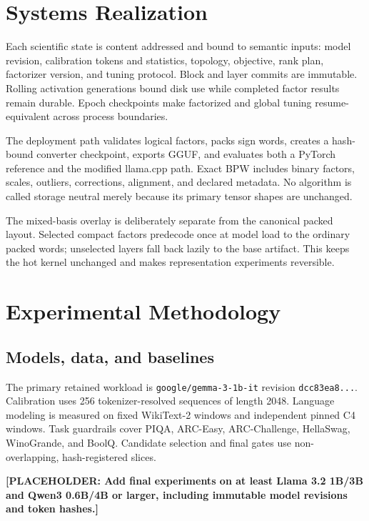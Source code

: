 \documentclass[10pt]{article}
\newcommand{\placeholder}[1]{\textcolor{red!70!black}{\textbf{[PLACEHOLDER: #1]}}}
\begin{document}
\section{Systems Realization}

Each scientific state is content addressed and bound to semantic inputs:
model revision, calibration tokens and statistics, topology, objective,
rank plan, factorizer version, and tuning protocol. Block and layer commits
are immutable. Rolling activation generations bound disk use while completed
factor results remain durable. Epoch checkpoints make factorized and global
tuning resume-equivalent across process boundaries.

The deployment path validates logical factors, packs sign words, creates a
hash-bound converter checkpoint, exports GGUF, and evaluates both a PyTorch
reference and the modified llama.cpp path. Exact BPW includes binary factors,
scales, outliers, corrections, alignment, and declared metadata. No algorithm
is called storage neutral merely because its primary tensor shapes are
unchanged.

The mixed-basis overlay is deliberately separate from the canonical packed
layout. Selected compact factors predecode once at model load to the ordinary
packed words; unselected layers fall back lazily to the base artifact. This
keeps the hot kernel unchanged and makes representation experiments reversible.

\section{Experimental Methodology}

\subsection{Models, data, and baselines}

The primary retained workload is \texttt{google/gemma-3-1b-it} revision
\texttt{dcc83ea8...}. Calibration uses 256 tokenizer-resolved sequences of
length 2048. Language modeling is measured on fixed WikiText-2 windows and
independent pinned C4 windows. Task guardrails cover PIQA, ARC-Easy,
ARC-Challenge, HellaSwag, WinoGrande, and BoolQ. Candidate selection and final
gates use non-overlapping, hash-registered slices.

\placeholder{Add final experiments on at least Llama 3.2 1B/3B and Qwen3
0.6B/4B or larger, including immutable model revisions and token hashes.}
\end{document}
